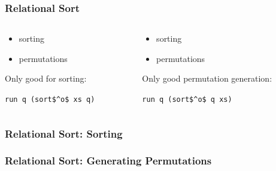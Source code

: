 \documentclass[xcolor=table, aspectratio=169]{beamer}
\newcommand{\happyCheck}{\color{green}{\checkmark}}
\newcommand{\timeout}{\color{red}{\clock}}
\begin{document}
\begin{frame}[fragile]
  \frametitle{Relational Sort}
\begin{columns}
  \begin{column}[t]{0.49\textwidth}
    

    \vfill

    \begin{center}
      \begin{itemize}
        \item[\happyCheck] sorting
        \item[\timeout] permutations
      \end{itemize}
      Only good for sorting:

      \lstinline{run q (sort$^o$ xs q)}
    \end{center}

  \end{column}
  \begin{column}[t]{0.49\textwidth}
    

    \vfill

    \begin{center}
      \begin{itemize}
        \item[\timeout] sorting
        \item[\happyCheck] permutations
      \end{itemize}
      Only good permutation generation:

      \lstinline{run q (sort$^o$ q xs)}
    \end{center}


  \end{column}
\end{columns}
\end{frame}

\begin{frame}[fragile]
  \frametitle{Relational Sort: Sorting}
    
\end{frame}


\begin{frame}[fragile]
  \frametitle{Relational Sort: Generating Permutations}
    
\end{frame}
\end{document}
